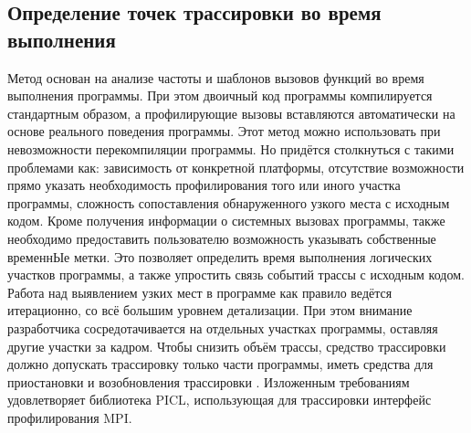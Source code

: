 \subsection{Определение точек трассировки во время выполнения} Метод основан на анализе частоты и шаблонов вызовов функций во время выполнения программы. При этом двоичный код программы компилируется стандартным образом, а профилирующие вызовы вставляются автоматически на основе реального поведения программы. Этот метод можно использовать при невозможности перекомпиляции программы. Но придётся столкнуться с такими проблемами как: зависимость от конкретной платформы, отсутствие возможности прямо указать необходимость профилирования того или иного участка программы, сложность сопоставления обнаруженного узкого места с исходным кодом.
Кроме получения информации о системных вызовах программы, также необходимо предоставить пользователю возможность указывать собственные временнЫе метки. Это позволяет определить время выполнения логических участков программы, а также упростить связь событий трассы с исходным кодом.
Работа над выявлением узких мест в программе как правило ведётся итерационно, со всё большим уровнем детализации. При этом внимание разработчика сосредотачивается на отдельных участках программы, оставляя другие участки за кадром. Чтобы снизить объём трассы, средство трассировки должно допускать трассировку только части программы, иметь средства для приостановки и возобновления трассировки \cite{book3}.
Изложенным требованиям удовлетворяет библиотека PICL, использующая для трассировки интерфейс профилирования MPI.
